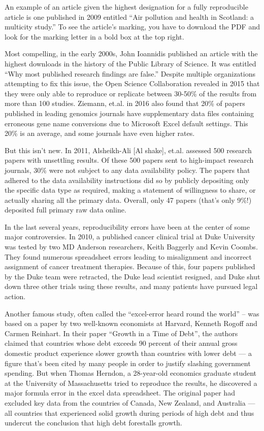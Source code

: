 \documentclass[]{book}
\theoremstyle{definition}
\theoremstyle{definition}
\theoremstyle{definition}
\theoremstyle{remark}
\begin{document}
An example of an article given the highest designation for a fully
reproducible article is one published in 2009 entitled ``Air pollution
and health in Scotland: a multicity study.'' To see the article's
marking, you have to download the PDF and look for the marking letter in
a bold box at the top right.

Most compelling, in the early 2000s, John Ioannidis published an article
with the highest downloads in the history of the Public Library of
Science. It was entitled ``Why most published research findings are
false.'' Despite multiple organizations attempting to fix this issue,
the Open Science Collaboration revealed in 2015 that they were only able
to reproduce or replicate between 30-50\% of the results from more than
100 studies. Ziemann, et.al. in 2016 also found that 20\% of papers
published in leading genomics journals have supplementary data files
containing erroneous gene name conversions due to Microsoft Excel
default settings. This 20\% is an average, and some journals have even
higher rates.

But this isn't new. In 2011, Alsheikh-Ali {[}Al shake{]}, et.al.
assessed 500 research papers with unsettling results. Of these 500
papers sent to high-impact research journals, 30\% were not subject to
any data availability policy. The papers that adhered to the data
availability instructions did so by publicly depositing only the
specific data type as required, making a statement of willingness to
share, or actually sharing all the primary data. Overall, only 47 papers
(that's only 9\%!) deposited full primary raw data online.

In the last several years, reproducibility errors have been at the
center of some major controversies. In 2010, a published cancer clinical
trial at Duke University was tested by two MD Anderson researchers,
Keith Baggerly and Kevin Coombs. They found numerous spreadsheet errors
leading to misalignment and incorrect assignment of cancer treatment
therapies. Because of this, four papers published by the Duke team were
retracted, the Duke lead scientist resigned, and Duke shut down three
other trials using these results, and many patients have pursued legal
action.

Another famous study, often called the ``excel-error heard round the
world'' -- was based on a paper by two well-known economists at Harvard,
Kenneth Rogoff and Carmen Reinhart. In their paper ``Growth in a Time of
Debt'', the authors claimed that countries whose debt exceeds 90 percent
of their annual gross domestic product experience slower growth than
countries with lower debt --- a figure that's been cited by many people
in order to justify slashing government spending. But when Thomas
Herndon, a 28-year-old economics graduate student at the University of
Massachusetts tried to reproduce the results, he discovered a major
formula error in the excel data spreadsheet. The original paper had
excluded key data from the countries of Canada, New Zealand, and
Australia --- all countries that experienced solid growth during periods
of high debt and thus undercut the conclusion that high debt forestalls
growth.
\end{document}
